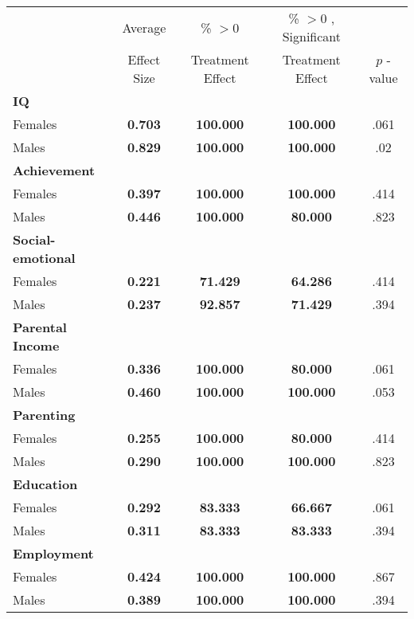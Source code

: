 \begin{tabular}{l c c c c}
\toprule
 & Average & \% $ >0 $ & \% $ >0 $ , Significant & \citet{Rosenbaum_2005_Distribution_JRSS} \\
 & Effect Size & Treatment Effect & Treatment Effect & $ p $ -value \\
\midrule
\textbf{IQ} & & & & \\
\quad Females &  \textbf{    0.703} & \textbf{  100.000} & \textbf{  100.000} & .061 \\
\quad Males &  \textbf{    0.829} & \textbf{  100.000} & \textbf{  100.000} & .02 \\
\midrule
\textbf{Achievement} & & & & \\
\quad Females &  \textbf{    0.397} & \textbf{  100.000} & \textbf{  100.000} & .414 \\
\quad Males &  \textbf{    0.446} & \textbf{  100.000} & \textbf{   80.000} & .823 \\
\midrule
\textbf{Social-emotional} & & & & \\
\quad Females &  \textbf{    0.221} & \textbf{   71.429} & \textbf{   64.286} & .414 \\
\quad Males &  \textbf{    0.237} & \textbf{   92.857} & \textbf{   71.429} & .394 \\
\midrule
\textbf{Parental Income} & & & & \\
\quad Females &  \textbf{    0.336} & \textbf{  100.000} & \textbf{   80.000} & .061 \\
\quad Males &  \textbf{    0.460} & \textbf{  100.000} & \textbf{  100.000} & .053 \\
\midrule
\textbf{Parenting} & & & & \\
\quad Females &  \textbf{    0.255} & \textbf{  100.000} & \textbf{   80.000} & .414 \\
\quad Males &  \textbf{    0.290} & \textbf{  100.000} & \textbf{  100.000} & .823 \\
\midrule
\textbf{Education} & & & & \\
\quad Females &  \textbf{    0.292} & \textbf{   83.333} & \textbf{   66.667} & .061 \\
\quad Males &  \textbf{    0.311} & \textbf{   83.333} & \textbf{   83.333} & .394 \\
\midrule
\textbf{Employment} & & & & \\
\quad Females &  \textbf{    0.424} & \textbf{  100.000} & \textbf{  100.000} & .867 \\
\quad Males &  \textbf{    0.389} & \textbf{  100.000} & \textbf{  100.000} & .394 \\

\end{tabular}
